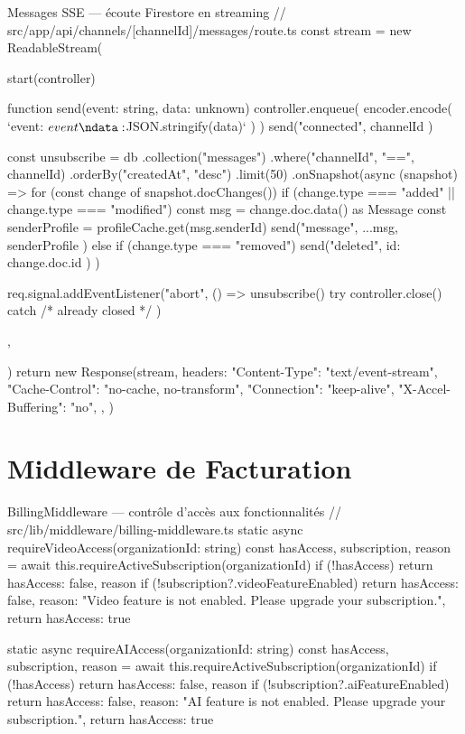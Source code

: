 \documentclass[12pt, a4paper, twoside]{report}
\begin{document}
\begin{codesnap}[TypeScript]{Messages SSE — écoute Firestore en streaming}
// src/app/api/channels/[channelId]/messages/route.ts
const stream = new ReadableStream({
  start(controller) {
    function send(event: string, data: unknown) {
      controller.enqueue(
        encoder.encode(
          `event: ${event}\ndata: ${JSON.stringify(data)}\n\n`
        )
      )
    }
    send("connected", { channelId })

    const unsubscribe = db
      .collection("messages")
      .where("channelId", "==", channelId)
      .orderBy("createdAt", "desc")
      .limit(50)
      .onSnapshot(async (snapshot) => {
        for (const change of snapshot.docChanges()) {
          if (change.type === "added" || change.type === "modified") {
            const msg = change.doc.data() as Message
            const senderProfile = profileCache.get(msg.senderId)
            send("message", { ...msg, senderProfile })
          } else if (change.type === "removed") {
            send("deleted", { id: change.doc.id })
          }
        }
      })

    req.signal.addEventListener("abort", () => {
      unsubscribe()
      try { controller.close() } catch { /* already closed */ }
    })
  },
})
return new Response(stream, {
  headers: {
    "Content-Type": "text/event-stream",
    "Cache-Control": "no-cache, no-transform",
    "Connection": "keep-alive",
    "X-Accel-Buffering": "no",
  },
})
\end{codesnap}

\section{Middleware de Facturation}

\begin{codesnap}[TypeScript]{BillingMiddleware — contrôle d'accès aux fonctionnalités}
// src/lib/middleware/billing-middleware.ts
static async requireVideoAccess(organizationId: string) {
  const { hasAccess, subscription, reason } =
    await this.requireActiveSubscription(organizationId)
  if (!hasAccess) return { hasAccess: false, reason }
  if (!subscription?.videoFeatureEnabled) {
    return {
      hasAccess: false,
      reason: "Video feature is not enabled. Please upgrade your subscription.",
    }
  }
  return { hasAccess: true }
}

static async requireAIAccess(organizationId: string) {
  const { hasAccess, subscription, reason } =
    await this.requireActiveSubscription(organizationId)
  if (!hasAccess) return { hasAccess: false, reason }
  if (!subscription?.aiFeatureEnabled) {
    return {
      hasAccess: false,
      reason: "AI feature is not enabled. Please upgrade your subscription.",
    }
  }
  return { hasAccess: true }
}
\end{codesnap}
\end{document}
